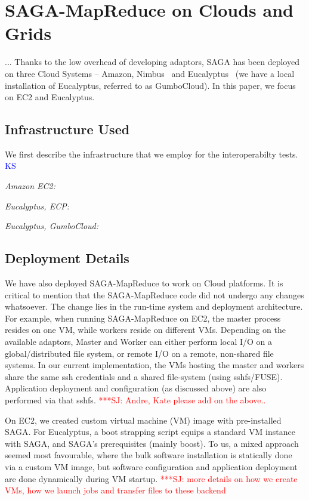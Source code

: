 \documentclass[conference,final]{IEEEtran}
\newcommand{\jhanote}[1]{ {\textcolor{red} { ***SJ: #1 }}}
\newcommand{\jhanote}[1]{}
\newcommand{\sagamapreduce }{SAGA-MapReduce }
\begin{document}
\section{SAGA-MapReduce on Clouds and Grids}

... Thanks to the low overhead of developing adaptors, SAGA has been
deployed on three Cloud Systems -- Amazon, Nimbus~\cite{nimbus} and
Eucalyptus~\cite{eucalyptus} (we have a local installation of
Eucalyptus, referred to as GumboCloud).  In this paper, we focus on
EC2 and Eucalyptus.


\subsection*{Infrastructure Used} We first describe the infrastructure
that we employ for the interoperabilty tests.  {\textcolor{blue}{KS}}

{\it Amazon EC2:}

{\it Eucalyptus, ECP:}

{\it Eucalyptus, GumboCloud:}



\subsection{Deployment Details}

We have also deployed \sagamapreduce to work on Cloud platforms.  It
is critical to mention that the \sagamapreduce code did not undergo
any changes whatsoever. The change lies in the run-time system and
deployment architecture. For example, when running \sagamapreduce on
EC2, the master process resides on one VM, while workers reside on
different VMs.  Depending on the available adaptors, Master and Worker
can either perform local I/O on a global/distributed file system, or
remote I/O on a remote, non-shared file systems.  In our current
implementation, the VMs hosting the master and workers share the same
ssh credentials and a shared file-system (using sshfs/FUSE).
Application deployment and configuration (as discussed above) are also
performed via that sshfs.  \jhanote{Andre, Kate please add on the
  above..}

On EC2, we created custom virtual machine (VM) image with
pre-installed SAGA.  For Eucalyptus, a boot strapping script equips a
standard VM instance with SAGA, and SAGA's prerequisites (mainly
boost).  To us, a mixed approach seemed most favourable, where the
bulk software installation is statically done via a custom VM image,
but software configuration and application deployment are done
dynamically during VM startup.  \jhanote{more details on how we create
  VMs, how we launch jobs and transfer files to these backend}
\end{document}
